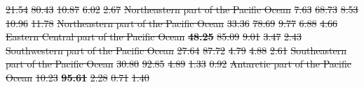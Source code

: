 \documentclass[12pt,authoryear]{elsarticle}
\providecommand{\DIFdeltex}[1]{{\protect\color{red}\sout{#1}}}                      %
\providecommand{\DIFdelFL}[1]{\DIFdel{#1}} %
\providecommand{\DIFaddbeginFL}{} %
\providecommand{\DIFdelendFL}{} %
\providecommand{\DIFdel}[1]{\texorpdfstring{\DIFdeltex{#1}}{}} %
\begin{document}
\begin{table}[h]
\DIFdelFL{21.54 }%
\DIFdelFL{80.43 }%
\DIFdelFL{10.87 }%
\DIFdelFL{6.02 }%
\DIFdelFL{2.67 }%
\DIFdelFL{Northeastern part of the Pacific Ocean     }%
\DIFdelFL{7.63 }%
\DIFdelFL{68.73 }%
\DIFdelFL{8.53 }%
\DIFdelFL{10.96 }%
\DIFdelFL{11.78 }%
\DIFdelFL{Northeastern part of the Pacific Ocean     }%
\DIFdelFL{33.36 }%
\DIFdelFL{78.69 }%
\DIFdelFL{9.77 }%
\DIFdelFL{6.88 }%
\DIFdelFL{4.66 }%
\DIFdelFL{Eastern Central part of the Pacific Ocean  }%
\textbf{\DIFdelFL{48.25}} %
\DIFdelFL{85.09 }%
\DIFdelFL{9.01 }%
\DIFdelFL{3.47 }%
\DIFdelFL{2.43 }%
\DIFdelFL{Southwestern part of the Pacific Ocean     }%
\DIFdelFL{27.64 }%
\DIFdelFL{87.72 }%
\DIFdelFL{4.79 }%
\DIFdelFL{4.88 }%
\DIFdelFL{2.61 }%
\DIFdelFL{Southeastern part of the Pacific Ocean     }%
\DIFdelFL{30.80 }%
\DIFdelFL{92.85 }%
\DIFdelFL{4.89 }%
\DIFdelFL{1.33 }%
\DIFdelFL{0.92 }%
\DIFdelFL{Antarctic part of the Pacific Ocean        }%
\DIFdelFL{10.23 }%
\textbf{\DIFdelFL{95.61}} %
\DIFdelFL{2.28 }%
\DIFdelFL{0.71 }%
\DIFdelFL{1.40 }%
\DIFdelendFL \DIFaddbeginFL {}
\end{table}
\end{document}

